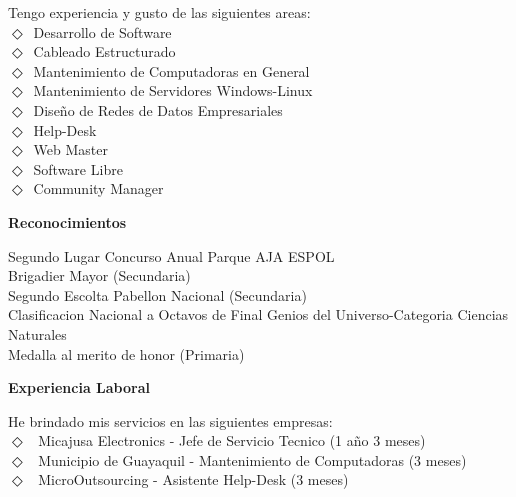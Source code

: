 \hspace{.3in}  Tengo experiencia y gusto de las siguientes areas: \\
\hspace{.3in}  $\Diamond$~Desarrollo de Software\\
\hspace{.3in}  $\Diamond$~Cableado Estructurado\\
\hspace{.3in}  $\Diamond$~Mantenimiento de Computadoras en General\\
\hspace{.3in}  $\Diamond$~Mantenimiento de Servidores Windows-Linux\\
\hspace{.3in}  $\Diamond$~Diseño de Redes de Datos Empresariales\\
\hspace{.3in}  $\Diamond$~Help-Desk\\
\hspace{.3in}  $\Diamond$~Web Master\\
\hspace{.3in}  $\Diamond$~Software Libre\\
\hspace{.3in}  $\Diamond$~Community Manager

{\bf Reconocimientos}


\hspace{.3in} Segundo Lugar Concurso Anual Parque AJA ESPOL\\
\hspace{.3in} Brigadier Mayor (Secundaria)\\
\hspace{.3in} Segundo Escolta Pabellon Nacional (Secundaria)\\
\hspace{.3in} Clasificacion Nacional a Octavos de Final Genios del Universo-Categoria Ciencias Naturales\\
\hspace{.3in} Medalla al merito de honor (Primaria)


{\bf Experiencia Laboral}

\hspace{.3in}  He brindado mis servicios en las siguientes empresas:\\
\hspace{.3in}  $\Diamond$~ Micajusa Electronics - Jefe de Servicio Tecnico (1 a\~{n}o 3 meses)\\
\hspace{.3in}  $\Diamond$~ Municipio de Guayaquil - Mantenimiento de Computadoras (3 meses)\\
\hspace{.3in}  $\Diamond$~ MicroOutsourcing - Asistente Help-Desk (3 meses)

